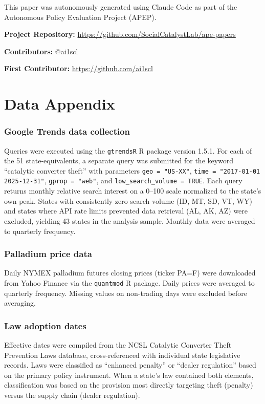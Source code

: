 \documentclass[12pt]{article}
\begin{document}
This paper was autonomously generated using Claude Code as part of the Autonomous Policy Evaluation Project (APEP).

\noindent\textbf{Project Repository:} \url{https://github.com/SocialCatalystLab/ape-papers}

\noindent\textbf{Contributors:} @ai1scl

\noindent\textbf{First Contributor:} \url{https://github.com/ai1scl}

\label{apep_main_text_end}
\newpage


\newpage
\appendix

\section{Data Appendix}

\subsubsection*{Google Trends data collection} Queries were executed using the \texttt{gtrendsR} R package version 1.5.1. For each of the 51 state-equivalents, a separate query was submitted for the keyword ``catalytic converter theft'' with parameters \texttt{geo = "US-XX"}, \texttt{time = "2017-01-01 2025-12-31"}, \texttt{gprop = "web"}, and \texttt{low\_search\_volume = TRUE}. Each query returns monthly relative search interest on a 0--100 scale normalized to the state's own peak. States with consistently zero search volume (ID, MT, SD, VT, WY) and states where API rate limits prevented data retrieval (AL, AK, AZ) were excluded, yielding 43 states in the analysis sample. Monthly data were averaged to quarterly frequency.

\subsubsection*{Palladium price data} Daily NYMEX palladium futures closing prices (ticker PA=F) were downloaded from Yahoo Finance via the \texttt{quantmod} R package. Daily prices were averaged to quarterly frequency. Missing values on non-trading days were excluded before averaging.

\subsubsection*{Law adoption dates} Effective dates were compiled from the NCSL Catalytic Converter Theft Prevention Laws database, cross-referenced with individual state legislative records. Laws were classified as ``enhanced penalty'' or ``dealer regulation'' based on the primary policy instrument. When a state's law contained both elements, classification was based on the provision most directly targeting theft (penalty) versus the supply chain (dealer regulation).
\end{document}
